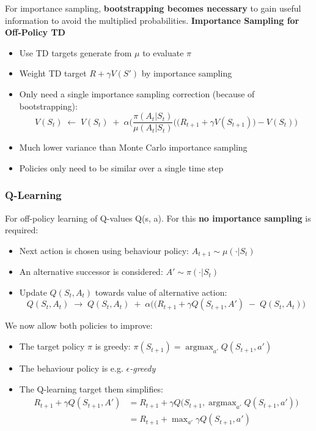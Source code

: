 \documentclass[10pt]{article}
\begin{document}
For importance sampling, \textbf{bootstrapping becomes necessary} to gain useful information to avoid the multiplied probabilities.
\newline \newline
\textbf{Importance Sampling for Off-Policy TD}
\begin{itemize}
\item Use TD targets generate from $\mu$ to evaluate $\pi$
\item Weight TD target $R + \gamma V(S')$ by importance sampling
\item Only need a single importance sampling correction (because of bootstrapping):
\begin{equation}
V(S_{t}) \; \leftarrow \; V(S_{t}) \; + \; \alpha \Big( \frac{\pi(A_{t} | S_{t})}{\mu(A_{t} | S_{t})} \big( (R_{t+1} + \gamma V(S_{t+1}) \big) - V(S_{t}) \Big)
\end{equation}
\item Much lower variance than Monte Carlo importance sampling
\item Policies only need to be similar over a single time step
\end{itemize}

\subsubsection*{Q-Learning}

For off-policy learning of Q-values Q(s, a). For this \textbf{no importance sampling} is required:
\begin{itemize}
\item Next action is chosen using behaviour policy: $A_{t+1} \sim \mu(\cdot | S_{t})$
\item An alternative successor is considered: $A' \sim \pi(\cdot | S_{t})$
\item Update $Q(S_{t}, A_{t})$ towards value of alternative action:
\begin{equation}
Q(S_{t}, A_{t}) \; \rightarrow \; Q(S_{t}, A_{t}) \; + \; \alpha \big( (R_{t+1} + \gamma Q(S_{t+1}, A') \; - \;  Q(S_{t}, A_{t})\big)
\end{equation}
\end{itemize}

We now allow both policies to improve:
\begin{itemize}
\item The target policy $\pi$ is greedy: $\pi(S_{t+1}) = \mathop{\text{argmax}}_{a'} Q(S_{t+1}, a')$ 
\item The behaviour policy is e.g. \textit{$\epsilon$-greedy}
\item The Q-learning target them simplifies:
\begin{align*}
R_{t+1} + \gamma Q(S_{t+1}, A') &= R_{t+1} + \gamma Q \big( S_{t+1}, \mathop{\text{argmax}}_{a'} Q(S_{t+1}, a') \big) \\
&= R_{t+1} + \mathop{\text{max}}_{a'} \gamma  Q(S_{t+1}, a')
\end{align*}
\end{itemize}
\end{document}
